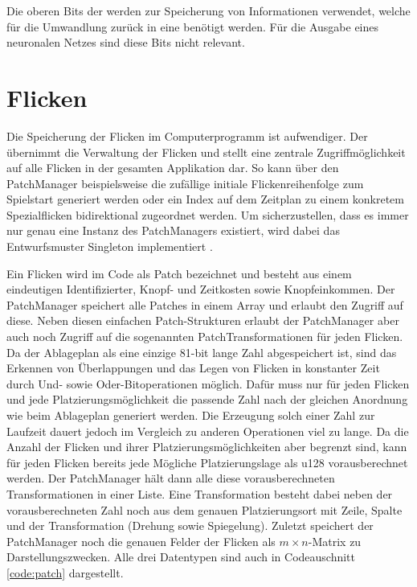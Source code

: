 Die oberen Bits der  werden zur Speicherung von Informationen verwendet, welche für die Umwandlung zurück in eine  benötigt werden. Für die Ausgabe eines neuronalen Netzes sind diese Bits nicht relevant.

\section{Flicken}

Die Speicherung der Flicken im Computerprogramm ist aufwendiger. Der  übernimmt die Verwaltung der Flicken und stellt eine zentrale Zugriffmöglichkeit auf alle Flicken in der gesamten Applikation dar. So kann über den PatchManager beispielsweise die zufällige initiale Flickenreihenfolge zum Spielstart generiert werden oder ein Index auf dem Zeitplan zu einem konkretem Spezialflicken bidirektional zugeordnet werden. Um sicherzustellen, dass es immer nur genau eine Instanz des PatchManagers existiert, wird dabei das Entwurfsmuster Singleton implementiert \cite[S. 127]{2000.Gamma}.


\vspace*{-1cm}

Ein Flicken wird im Code als Patch bezeichnet und besteht aus einem eindeutigen Identifizierter, Knopf- und Zeitkosten sowie Knopfeinkommen. Der PatchManager speichert alle Patches in einem Array und erlaubt den Zugriff auf diese. Neben diesen einfachen Patch-Strukturen erlaubt der PatchManager aber auch noch Zugriff auf die sogenannten PatchTransformationen für jeden Flicken. Da der Ablageplan als eine einzige 81-bit lange Zahl abgespeichert ist, sind das Erkennen von Überlappungen und das Legen von Flicken in konstanter Zeit durch Und- sowie Oder-Bitoperationen möglich. Dafür muss nur für jeden Flicken und jede Platzierungsmöglichkeit die passende Zahl nach der gleichen Anordnung wie beim Ablageplan generiert werden. Die Erzeugung solch einer Zahl zur Laufzeit dauert jedoch im Vergleich zu anderen Operationen viel zu lange. Da die Anzahl der Flicken und ihrer Platzierungsmöglichkeiten aber begrenzt sind, kann für jeden Flicken bereits jede Mögliche Platzierungslage als \ac{u128} vorausberechnet werden. Der PatchManager hält dann alle diese vorausberechneten Transformationen in einer Liste. Eine Transformation besteht dabei neben der vorausberechneten Zahl noch aus dem genauen Platzierungsort mit Zeile, Spalte und der Transformation (Drehung sowie Spiegelung). Zuletzt speichert der PatchManager noch die genauen Felder der Flicken als $m\times n$-Matrix zu Darstellungszwecken. Alle drei Datentypen sind auch in Codeauschnitt \ref{code:patch} dargestellt.

